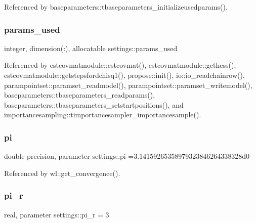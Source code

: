 Referenced by baseparameters\+::tbaseparameters\+\_\+initializeusedparams().

\mbox{\label{namespacesettings_a2d59bb48a1012143991ce9093fc76be5}} 
\subsubsection{\texorpdfstring{params\+\_\+used}{params\_used}}
{\footnotesize\ttfamily integer, dimension(\+:), allocatable settings\+::params\+\_\+used}



Referenced by estcovmatmodule\+::estcovmat(), estcovmatmodule\+::gethess(), estcovmatmodule\+::getstepsfordchisq1(), propose\+::init(), io\+::io\+\_\+readchainrow(), parampointset\+::paramset\+\_\+readmodel(), parampointset\+::paramset\+\_\+writemodel(), baseparameters\+::tbaseparameters\+\_\+readparams(), baseparameters\+::tbaseparameters\+\_\+setstartpositions(), and importancesampling\+::timportancesampler\+\_\+importancesample().

\mbox{\label{namespacesettings_a57710b73441b5ec0babcaa48cd333055}} 
\subsubsection{\texorpdfstring{pi}{pi}}
{\footnotesize\ttfamily double precision, parameter settings\+::pi =3.\+14159265358979323846264338328d0}



Referenced by wl\+::get\+\_\+convergence().

\mbox{\label{namespacesettings_a6fe3b2dcac06d9e51592e885f64ace1d}} 
\subsubsection{\texorpdfstring{pi\+\_\+r}{pi\_r}}
{\footnotesize\ttfamily real, parameter settings\+::pi\+\_\+r = 3.}

\mbox{\label{namespacesettings_a54504c6d9151b9990bf3f15deeaa139b}} 

